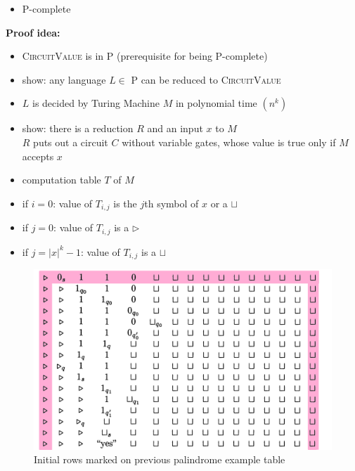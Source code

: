 \documentclass[a4]{scrartcl}
\begin{document}
\begin{itemize}
\item \textsc{P}-complete
\end{itemize}

\textbf{Proof idea:}

\begin{itemize}
\item \textsc{CircuitValue} is in P (prerequisite for being P-complete)
\item show: any language $L \in $ P can be reduced to \textsc{CircuitValue}
\item $L$ is decided by Turing Machine $M$ in polynomial time $(n^k)$
\item show: there is a reduction $R$ and an input $x$ to $M$ \\
$R$ puts out a circuit $C$ without variable gates, whose value is true
only if $M$ accepts $x$
\item computation table $T$ of $M$
\item if $i=0$: value of $T_{i,j}$ is the $j$th symbol of $x$ or a $\sqcup$
\item if $j=0$: value of $T_{i,j}$ is a $\triangleright$
\item if $j=|x|^k-1$: value of $T_{i,j}$ is a $\sqcup$
\end{itemize}

\begin{figure}[H]
\begin{center}
\includegraphics[scale=0.3]{rowsmarked.png}
\end{center}
\caption{Initial rows marked on previous palindrome example table}
\end{figure}
\end{document}
